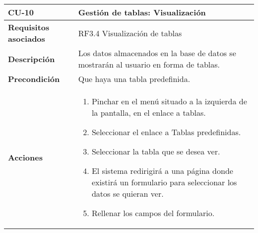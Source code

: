 \newpage
\begin{longtable}[H]{@{}ll@{}}
\toprule
\begin{minipage}[b]{0.23\columnwidth}\raggedright\strut
\textbf{CU-10}\strut
\end{minipage} & \begin{minipage}[b]{0.71\columnwidth}\raggedright\strut
\textbf{Gestión de tablas: Visualización}\strut
\end{minipage}\tabularnewline
\midrule
\endhead
\begin{minipage}[t]{0.23\columnwidth}\raggedright\strut
\textbf{Requisitos asociados}\strut
\end{minipage} & \begin{minipage}[t]{0.71\columnwidth}\raggedright\strut
RF3.4 Visualización de tablas\strut
\end{minipage}\tabularnewline
\begin{minipage}[t]{0.23\columnwidth}\raggedright\strut
\textbf{Descripción}\strut
\end{minipage} & \begin{minipage}[t]{0.71\columnwidth}\raggedright\strut
Los datos almacenados en la base de datos se mostrarán al usuario en forma
de tablas.
\strut
\end{minipage}\tabularnewline
\begin{minipage}[t]{0.23\columnwidth}\raggedright\strut
\textbf{Precondición}\strut
\end{minipage} & \begin{minipage}[t]{0.71\columnwidth}\raggedright\strut
Que haya una tabla predefinida.\strut
\end{minipage}\tabularnewline
\begin{minipage}[t]{0.23\columnwidth}\raggedright\strut
\textbf{Acciones}\strut
\end{minipage} & \begin{minipage}[t]{0.71\columnwidth}\raggedright\strut
\begin{enumerate}
\def\labelenumi{\arabic{enumi}.}
\tightlist
\item
Pinchar en el menú situado a la izquierda de la pantalla, en el
enlace a tablas.
\item
Seleccionar el enlace a Tablas predefinidas.
\item
Seleccionar la tabla que se desea ver.
\item
El sistema redirigirá a una página donde existirá un formulario para seleccionar los datos se quieran ver.
\item 
Rellenar los campos del formulario.

\end{enumerate}
\end{minipage}
\end{longtable}
